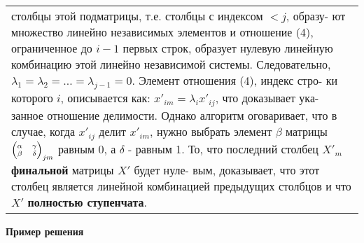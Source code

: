 	\begin{tabular}{|p{12.5cm}}
	\noindent
	столбцы этой подматрицы, т.е. столбцы с индексом $< j$, образу-\linebreak
	ют множество линейно независимых элементов и отношение (4),\linebreak
	ограниченное до $i - 1$ первых строк, образует нулевую линейную\linebreak
	комбинацию этой линейно независимой системы. Следовательно,\linebreak
	$\lambda_1 = \lambda_2 = \ldots = \lambda_{j - 1} = 0$. Элемент отношения (4), индекс стро-\linebreak
	ки которого $i$, описывается как: $x'_{im} = \lambda_i x'_{ij}$, что доказывает ука-\linebreak
	занное отношение делимости. Однако алгоритм оговаривает, что\linebreak
	в случае, когда $x'_{ij}$ делит $x'_{im}$, нужно выбрать элемент $\beta$ матрицы\linebreak
	${\scriptsize \begin{pmatrix} \alpha & \gamma\\ \beta & \delta \end{pmatrix}_{jm}}$ равным 0, а $\delta$ - равным 1.\linebreak
	То, что последний столбец $X'_m$ {\bf финальной} матрицы $X'$ будет нуле-\linebreak
	вым, доказывает, что этот столбец является линейной комбинацией\linebreak
	предыдущих столбцов и что $X'$ {\bf полностью ступенчата}.
	\end{tabular}
	
	\noindent
	{\bf Пример решения}
	

